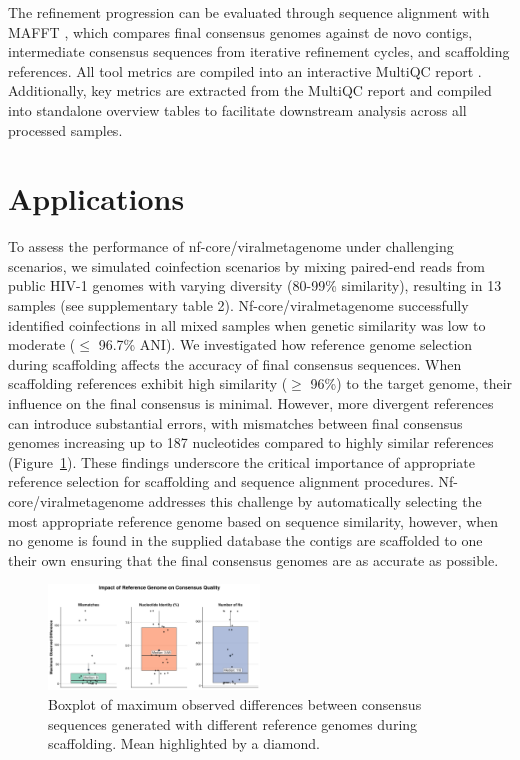The refinement progression can be evaluated through sequence alignment with MAFFT \cite{Katoh2002-ox}, which compares final consensus genomes against de novo contigs, intermediate consensus sequences from iterative refinement cycles, and scaffolding references. All tool metrics are compiled into an interactive MultiQC report \cite{Ewels2016-hs}. Additionally, key metrics are extracted from the MultiQC report and compiled into standalone overview tables to facilitate downstream analysis across all processed samples.

\section{Applications}

To assess the performance of nf-core/viralmetagenome under challenging scenarios, we simulated coinfection scenarios by mixing paired-end reads from public HIV-1 genomes with varying diversity (80-99\% similarity), resulting in 13 samples (see supplementary table 2). Nf-core/viralmetagenome successfully identified coinfections in all mixed samples when genetic similarity was low to moderate ($\leq$ 96.7\% ANI).
We investigated how reference genome selection during scaffolding affects the accuracy of final consensus sequences. When scaffolding references exhibit high similarity ($\geq$ 96\%) to the target genome, their influence on the final consensus is minimal. However, more divergent references can introduce substantial errors, with mismatches between final consensus genomes increasing up to 187 nucleotides compared to highly similar references (Figure~\ref{fig:reference-influence}). These findings underscore the critical importance of appropriate reference selection for scaffolding and sequence alignment procedures. Nf-core/viralmetagenome addresses this challenge by automatically selecting the most appropriate reference genome based on sequence similarity, however, when no genome is found in the supplied database the contigs are scaffolded to one their own ensuring that the final consensus genomes are as accurate as possible.

\begin{figure}[htbp]
    \centering
    \includegraphics[width=0.5\textwidth]{Fig/fig2.png}
    \caption{Boxplot of maximum observed differences between consensus sequences generated with different reference genomes during scaffolding. Mean highlighted by a diamond.}
    \label{fig:reference-influence}
\end{figure}

